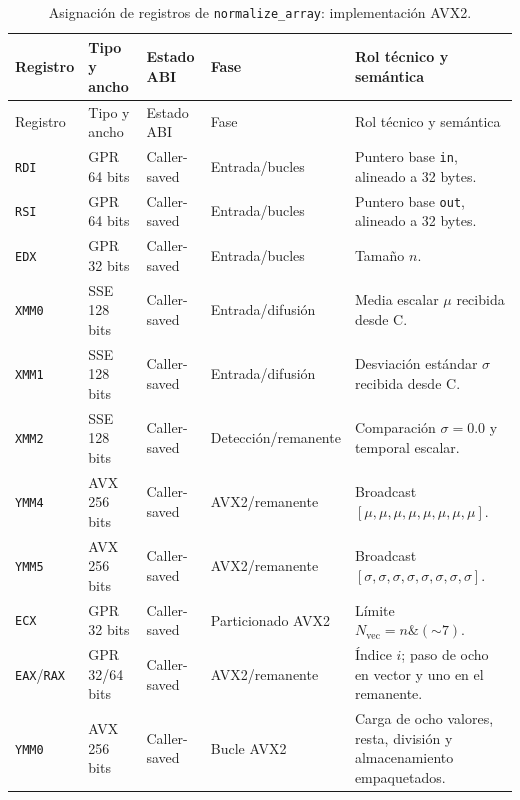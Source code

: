 \documentclass[journal]{IEEEtran}
\begin{document}
\begin{longtable}{@{}>{\raggedright\arraybackslash}p{}
  >{\raggedright\arraybackslash}p{}
  >{\raggedright\arraybackslash}p{}
  >{\raggedright\arraybackslash}p{}
  >{\raggedright\arraybackslash}p{}@{}}
\caption{Asignación de registros de \texttt{normalize\_array}: implementación AVX2.}
\label{tab:normalize-avx2-registers}\\
\toprule
Registro & Tipo y ancho & Estado ABI & Fase & Rol técnico y semántica \\
\midrule
\endfirsthead
\toprule
Registro & Tipo y ancho & Estado ABI & Fase & Rol técnico y semántica \\
\midrule
\endhead
\bottomrule
\endfoot
\texttt{RDI} & GPR 64 bits & Caller-saved & Entrada/bucles & Puntero base
  \texttt{in}, alineado a 32 bytes. \\
\texttt{RSI} & GPR 64 bits & Caller-saved & Entrada/bucles & Puntero base
  \texttt{out}, alineado a 32 bytes. \\
\texttt{EDX} & GPR 32 bits & Caller-saved & Entrada/bucles & Tamaño $n$. \\
\texttt{XMM0} & SSE 128 bits & Caller-saved & Entrada/difusión & Media escalar
  $\mu$ recibida desde C. \\
\texttt{XMM1} & SSE 128 bits & Caller-saved & Entrada/difusión & Desviación estándar
  $\sigma$ recibida desde C. \\
\texttt{XMM2} & SSE 128 bits & Caller-saved & Detección/remanente & Comparación
  $\sigma=0.0$ y temporal escalar. \\
\texttt{YMM4} & AVX 256 bits & Caller-saved & AVX2/remanente & Broadcast
  $[\mu,\mu,\mu,\mu,\mu,\mu,\mu,\mu]$. \\
\texttt{YMM5} & AVX 256 bits & Caller-saved & AVX2/remanente & Broadcast
  $[\sigma,\sigma,\sigma,\sigma,\sigma,\sigma,\sigma,\sigma]$. \\
\texttt{ECX} & GPR 32 bits & Caller-saved & Particionado AVX2 & Límite
  $N_{\mathrm{vec}}=n\mathbin{\&}(\mathord{\sim}7)$. \\
\texttt{EAX}/\texttt{RAX} & GPR 32/64 bits & Caller-saved & AVX2/remanente &
  Índice $i$; paso de ocho en vector y uno en el remanente. \\
\texttt{YMM0} & AVX 256 bits & Caller-saved & Bucle AVX2 & Carga de ocho valores,
  resta, división y almacenamiento empaquetados. \\
\end{longtable}

\endgroup
\end{document}
